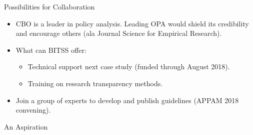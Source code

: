 \documentclass{beamer}
\begin{document}
\begin{frame}{Discussion}

\end{itemize}
\end{frame}

\begin{frame}{Possibilities for Collaboration}
\begin{itemize}
\item CBO is a leader in policy analysis. Leading OPA would shield its credibility and encourage others (ala Journal Science for Empirical Research). 
\item{What can BITSS offer: }
\begin{itemize}
\item Technical support next case study (funded through August 2018).
\item Training on research transparency methods.
\end{itemize}
\item Join a group of experts to develop and publish guidelines (APPAM 2018 convening).
\end{itemize}
\end{frame}


\begin{frame}{An Aspiration}
\end{frame}
\end{document}
